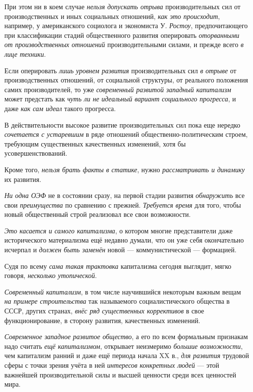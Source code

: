 \documentclass[a4paper,14pt,russian]{extreport}
\begin{document}
При этом ни в коем случае \emph{нельзя допускать отрыва} производительных сил от производственных и иных социальных отношений, \emph{как это происходит}, например, у американского социолога и экономиста У. \emph{Ростоу}, предпочитающего при классификации стадий общественного развития оперировать \emph{оторванными от производственных отношений} производительными силами, и прежде всего \emph{в лице техники}.

Если оперировать \emph{лишь уровнем развития} производительных сил \emph{в отрыве} от производственных отношений, от социальной структуры, от реального положения самих производителей, то уже \emph{современный развитой западный капитализм} может предстать как \emph{чуть ли не идеальный вариант социального прогресса}, и даже \emph{как сам идеал} такого прогресса.

В действительности высокое развитие производительных сил пока еще нередко \emph{сочетается с устаревшим} в ряде отношений общественно-политическим строем, требующим существенных качественных изменений, хотя бы усовершенствований.

Кроме того, \emph{нельзя брать факты в статике}, нужно \emph{рассматривать и динамику} их развития.

\emph{Ни одна ОЭФ} не в состоянии сразу, на первой стадии развития \emph{обнаружить} все свои \emph{преимущества} по сравнению с прежней. \emph{Требуется время} для того, чтобы новый общественный строй реализовал все свои возможности.

\emph{Это касается и самого капитализма}, о котором многие представители даже исторического материализма ещё недавно думали, что он уже себя окончательно исчерпал и \emph{должен быть заменён} новой --- коммунистической --- формацией.

Судя по всему \emph{сама такая трактовка} капитализма сегодня выглядит, мягко говоря, \emph{несколько утопической}.

\emph{Современный капитализм}, в том числе научившийся некоторым важным вещам \emph{на примере строительства} так называемого социалистического общества в СССР, других странах, \emph{внёс ряд существенных коррективов} в свое функционирование, в сторону развития, качественных изменений.

\emph{Современное западное развитое общество}, а его по всем формальным признакам надо считать \emph{ещё капитализмом}, открывает неизмеримо \emph{большие возможности}, чем капитализм ранний и даже ещё периода начала XX в., \emph{для развития} трудовой сферы с точки зрения учёта в ней \emph{интересов конкретных людей} --- этой важнейшей производительной силы и высшей ценности среди всех ценностей мира.
\end{document}
